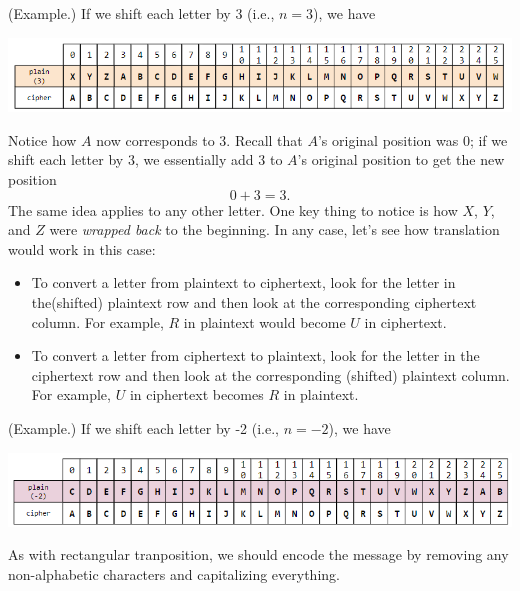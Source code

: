 \documentclass[letterpaper]{article}
\newcommand{\0}{\mathbf{0}}
\begin{document}
\begin{mdframed}
    (Example.) If we shift each letter by 3 (i.e., $n = 3$), we have 
    \begin{center}
        \includegraphics[scale=0.7]{assets/ceasar_2.png}
    \end{center}
    Notice how $A$ now corresponds to 3. Recall that $A$'s original position was 0; if we shift each letter by 3, we essentially add 3 to $A$'s original position to get the new position 
    \[0 + 3 = 3.\]
    The same idea applies to any other letter. One key thing to notice is how $X$, $Y$, and $Z$ were \emph{wrapped back} to the beginning. In any case, let's see how translation would work in this case: 
    \begin{itemize}
        \item To convert a letter from plaintext to ciphertext, look for the letter in the(shifted) plaintext row and then look at the corresponding ciphertext column. For example, $R$ in plaintext would become $U$ in ciphertext. 
        \item To convert a letter from ciphertext to plaintext, look for the letter in the ciphertext row and then look at the corresponding (shifted) plaintext column. For example, $U$ in ciphertext becomes $R$ in plaintext. 
    \end{itemize}
\end{mdframed}

\begin{mdframed}
    (Example.) If we shift each letter by -2 (i.e., $n = -2$), we have 
    \begin{center}
        \includegraphics[scale=0.7]{assets/ceasar_3.png}
    \end{center}
\end{mdframed}

As with rectangular tranposition, we should encode the message by removing any non-alphabetic characters and capitalizing everything. 
\end{document}
